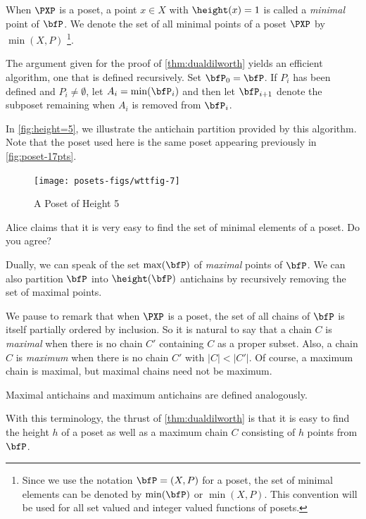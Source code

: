 When $\PXP$ is a poset, a point $x\in X$ with $\height(x)=1$ is 
called a \textit{minimal} point of $\bfP$.  We denote the set of all minimal
points of a poset $\PXP$ by $\min(X,P)$ \footnote{Since we use the
notation $\bfP= (X,P)$ for a poset, the set of minimal elements can
be denoted by $ \min(\bfP)$ or $\min(X,P)$. This convention will be
used for all set valued and integer valued functions of posets.}.

The argument given for the proof of \autoref{thm:dualdilworth} yields
an efficient algorithm, one that is defined recursively.  Set $\bfP_0=
\bfP$.  If $P_i$ has been defined and $P_i\neq \emptyset$, let
$A_i=\min(\bfP_i)$ and then let $\bfP_{i+1}$ denote the subposet remaining
when $A_i$ is removed from $\bfP_i$.

In \autoref{fig:height=5}, we illustrate the antichain partition
provided by this algorithm.  Note that the poset used here
is the same poset appearing previously in \autoref{fig:poset-17pts}.

\begin{figure}
\begin{center}
\texttt{[image: posets-figs/wttfig-7]}
\caption{A Poset of Height 5}
\label{fig:height=5}
\end{center}
\end{figure}

\begin{remark}
Alice claims that it is very easy to find the set of minimal elements of
a poset.  Do you agree?
\end{remark}

Dually, we can speak of the set $\max(\bfP)$ of \textit{maximal} points
of $\bfP$.  We can also partition $\bfP$ into $\height(\bfP)$ antichains
by recursively removing the set of maximal points.

We pause to remark that when $\PXP$ is a poset, the set of all chains of
$\bfP$ is itself partially ordered by inclusion.  So it is natural to
say that a chain $C$ is \textit{maximal} when there is no chain
$C'$ containing $C$ as a proper subset.  Also, a chain $C$ is \textit{maximum}
when there is no chain $C'$ with $|C|<|C'|$.  Of course, a maximum chain
is maximal, but maximal chains need not be maximum.

Maximal antichains and maximum antichains are defined analogously.

With this terminology, the thrust of \autoref{thm:dualdilworth} is
that it is easy to find the height $h$ of a poset as well as a maximum
chain $C$ consisting of $h$ points from $\bfP$.

